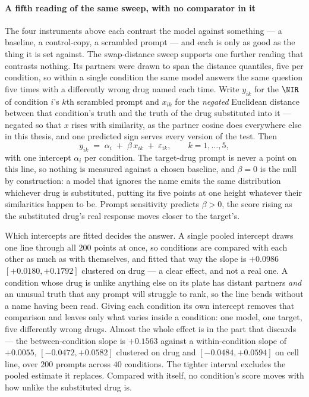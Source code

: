     \paragraph{A fifth reading of the same sweep, with no comparator in it} 
    The four
  instruments above each contrast the model against something --- a baseline, a
  control-copy, a scrambled prompt --- and each is only as good as the thing it is
  set against. The swap-distance sweep supports one further reading that contrasts
  nothing. Its partners were drawn to span the distance quantiles, five per
  condition, so within a single condition the same model answers the same question
  five times with a differently wrong drug named each time. Write $y_{ik}$ for the
  $\NIR$ of condition $i$'s $k$th scrambled prompt and $x_{ik}$ for the
  \emph{negated} Euclidean distance between that condition's truth and the truth of
  the drug substituted into it --- negated so that $x$ rises with similarity, as
  the partner cosine does everywhere else in this thesis, and one predicted sign
  serves every version of the test. Then
  \begin{equation}
   y_{ik} \;=\; \alpha_i \;+\; \beta\,x_{ik} \;+\; \varepsilon_{ik},
   \qquad k = 1,\dots,5,
  \end{equation}
  with one intercept $\alpha_i$ per condition. The target-drug prompt is never a
  point on this line, so nothing is measured against a chosen baseline, and
  $\beta = 0$ is the null by construction: a model that ignores the name emits the
  same distribution whichever drug is substituted, putting its five points at one
  height whatever their similarities happen to be. Prompt sensitivity predicts
  $\beta > 0$, the score rising as the substituted drug's real response moves
  closer to the target's.

  Which intercepts are fitted decides the answer. A single pooled intercept draws
  one line through all $200$ points at once, so conditions are compared with each
  other as much as with themselves, and fitted that way the slope is $+0.0986$
  $[+0.0180, +0.1792]$ clustered on drug --- a clear effect, and not a real one. A
  condition whose drug is unlike anything else on its plate has distant partners
  \emph{and} an unusual truth that any prompt will struggle to rank, so the line
  bends without a name having been read. Giving each condition its own intercept
  removes that comparison and leaves only what varies inside a condition: one
  model, one target, five differently wrong drugs. Almost the whole effect is in
  the part that discards --- the between-condition slope is $+0.1563$ against a
  within-condition slope of $+0.0055$, $[-0.0472, +0.0582]$ clustered on drug and
  $[-0.0484, +0.0594]$ on cell line, over $200$ prompts across $40$ conditions.
  The tighter interval excludes the pooled estimate it replaces. Compared with
  itself, no condition's score moves with how unlike the substituted drug is.

